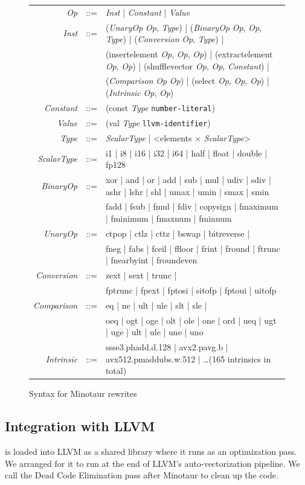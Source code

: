 \begin{figure}[tbp]
  \small
  \begin{tabular}{r c l}
    \emph{Op} &::=& \emph{Inst} | \emph{Constant} | \emph{Value} \\
    \emph{Inst}  &::=& (\emph{UnaryOp} \emph{Op}, \emph{Type}) | (\emph{BinaryOp} \emph{Op}, \emph{Op}, \emph{Type}) | (\emph{Conversion} \emph{Op}, \emph{Type}) |\\
              && (insertelement \emph{Op}, \emph{Op}, \emph{Op}) | (extractelement \emph{Op}, \emph{Op}) | (shufflevector \emph{Op}, \emph{Op}, \emph{Constant}) |\\
              && (\emph{Comparison} \emph{Op} \emph{Op}) | (select \emph{Op}, \emph{Op}, \emph{Op}) | (\emph{Intrinsic} \emph{Op}, \emph{Op}) \\
    \emph{Constant} &::=& (const \emph{Type} \texttt{number-literal}) \\
    \emph{Value} &::=& (val \emph{Type} \texttt{llvm-identifier}) \\

    \emph{Type} &::=& \emph{ScalarType} | <elements $\times$ \emph{ScalarType}> \\
    \emph{ScalarType} &::=& i1 | i8 | i16 | i32 | i64 | half | float | double | fp128 \\
    \emph{BinaryOp} &::=& xor | and | or | add | sub | mul | udiv | sdiv | ashr | lshr | shl | umax | umin | smax | smin\\
                && fadd | fsub | fmul | fdiv | copysign | fmaximum | fminimum | fmaxnum | fminnum \\
    \emph{UnaryOp} &::=& ctpop | ctlz | cttz | bswap | bitreverse |\\
                      && fneg | fabs | fceil | ffloor | frint | fround | ftrunc | fnearbyint | froundeven \\
    \emph{Conversion} &::=& zext | sext | trunc |\\
                    && fptrunc | fpext | fptosi | sitofp | fptoui | uitofp \\
    \emph{Comparison} &::=& eq | ne | ult | ule | slt | sle |\\
                && oeq | ogt | oge | olt | ole | one | ord | ueq | ugt | uge | ult | ule | une | uno \\
    \emph{Intrinsic} &::=& ssse3.phadd.d.128 | avx2.pavg.b | avx512.pmaddubs.w.512 | \dots (165 intrinsics in total) \\
  \end{tabular}
  \caption{Syntax for Minotaur rewrites}
  \label{fig:syntax}
\end{figure}



\subsection{Integration with LLVM}

\minotaur{} is loaded into LLVM as a shared library where it runs as an
optimization pass.
%
We arranged for it to run at the end of LLVM's auto-vectorization pipeline.
%
We call the Dead Code Elimination pass after Minotaur to
clean up the code.
